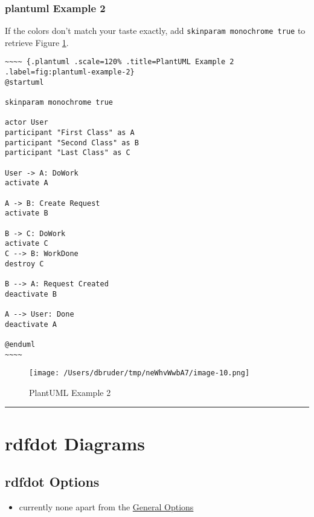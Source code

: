 \documentclass[]{article}
\begin{document}
\newpage

\subsubsection{plantuml Example 2}\label{plantuml-example-2}

If the colors don't match your taste exactly, add
\texttt{skinparam monochrome true} to retrieve Figure
\ref{fig:plantuml-example-2}.

\scriptsize

\begin{verbatim}
~~~~ {.plantuml .scale=120% .title=PlantUML Example 2 .label=fig:plantuml-example-2}
@startuml

skinparam monochrome true

actor User
participant "First Class" as A
participant "Second Class" as B
participant "Last Class" as C

User -> A: DoWork
activate A

A -> B: Create Request
activate B

B -> C: DoWork
activate C
C --> B: WorkDone
destroy C

B --> A: Request Created
deactivate B

A --> User: Done
deactivate A

@enduml
~~~~
\end{verbatim}

\normalsize

\begin{figure}[htbp]
\centering
\texttt{[image: /Users/dbruder/tmp/neWhvWwbA7/image-10.png]}
\caption{PlantUML Example 2\label{fig:plantuml-example-2}}
\end{figure}

\newpage

\begin{center}\rule{3in}{0.4pt}\end{center}

\newpage

\section{rdfdot Diagrams}\label{rdfdot-diagrams}

\subsection{rdfdot Options}\label{rdfdot-options}

\begin{itemize}
\itemsep1pt\parskip0pt
\item
  currently none apart from the \hyperref[general-options]{General
  Options}
\end{itemize}
\end{document}

